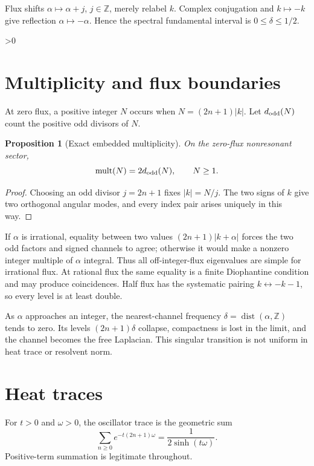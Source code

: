 \documentclass[10pt]{article}
\providecommand{\CRevisionRound}{2}
\newtheorem{proposition}{Proposition}
\newcommand{\Z}{\mathbb Z}
\begin{document}
Flux shifts $\alpha\mapsto\alpha+j$, $j\in\Z$, merely relabel $k$.
Complex conjugation and $k\mapsto-k$ give reflection
$\alpha\mapsto-\alpha$.  Hence the spectral fundamental interval is
$0\leq\delta\leq1/2$.

\ifnum\CRevisionRound>0
\section{Multiplicity and flux boundaries}
At zero flux, a positive integer $N$ occurs when
$N=(2n+1)|k|$.  Let $d_{\rm odd}(N)$ count the positive odd divisors of $N$.

\begin{proposition}[Exact embedded multiplicity]\label{prop:mult}
On the zero-flux nonresonant sector,
\begin{equation}\label{eq:mult}
 \operatorname{mult}(N)=2d_{\rm odd}(N),\qquad N\geq1.
\end{equation}
\end{proposition}
\begin{proof}
Choosing an odd divisor $j=2n+1$ fixes $|k|=N/j$.  The two signs of $k$
give two orthogonal angular modes, and every index pair arises uniquely in
this way.
\end{proof}

If $\alpha$ is irrational, equality between two values
$(2n+1)|k+\alpha|$ forces the two odd factors and signed channels to agree;
otherwise it would make a nonzero integer multiple of $\alpha$ integral.
Thus all off-integer-flux eigenvalues are simple for irrational flux.  At
rational flux the same equality is a finite Diophantine condition and may
produce coincidences.  Half flux has the systematic pairing
$k\leftrightarrow-k-1$, so every level is at least double.

As $\alpha$ approaches an integer, the nearest-channel frequency
$\delta=\operatorname{dist}(\alpha,\Z)$ tends to zero.  Its levels
$(2n+1)\delta$ collapse, compactness is lost in the limit, and the channel
becomes the free Laplacian.  This singular transition is not uniform in
heat trace or resolvent norm.

\section{Heat traces}
For $t>0$ and $\omega>0$, the oscillator trace is the geometric sum
\begin{equation}\label{eq:channelheat}
 \sum_{n\geq0}e^{-t(2n+1)\omega}
 =\frac1{2\sinh(t\omega)}.
\end{equation}
Positive-term summation is legitimate throughout.
\end{document}
